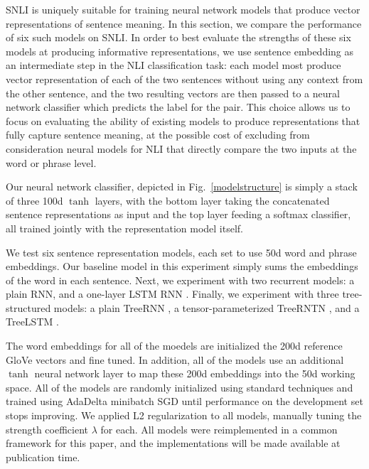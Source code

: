 SNLI is uniquely suitable for training neural network models that produce vector representations of sentence meaning. In this section, we compare the performance of six such models on SNLI. 
In order to best evaluate the strengths of these six models at producing informative representations, we use sentence embedding as an intermediate step in the NLI classification task: each model most produce vector representation of each of the two sentences without using any context from the other sentence, and the two resulting vectors are then passed to a neural network classifier which predicts the label for the pair. This choice allows us to focus on evaluating the ability of existing models to produce representations that fully capture sentence meaning, at the possible cost of excluding from consideration neural models for NLI that directly compare the two inputs at the word or phrase level.



Our neural network classifier, depicted in Fig.~\ref{modelstructure} is simply a stack of three 100d $\tanh$ layers, with the bottom layer taking the concatenated sentence representations as input and the top layer feeding a softmax classifier, all trained jointly with the representation model itself.

We test six sentence representation models, each set to use 50d word and phrase embeddings. Our baseline model in this experiment simply sums the embeddings of the word in each sentence. Next, we experiment with two recurrent models: a plain RNN, and a one-layer LSTM RNN \cite{hochreiter1997long}. Finally, we experiment with three tree-structured models: a plain TreeRNN \cite{socher2011semi}, a tensor-parameterized TreeRNTN \cite{socher2013acl1}, and a TreeLSTM \cite{tai2015improved}.

The word embeddings for all of the moedels are initialized the 200d reference GloVe vectors \cite{pennington2014glove} and fine tuned. In addition, all of the models use an additional $\tanh$ neural network layer to map these 200d embeddings into the 50d working space. All of the models are randomly initialized using standard techniques and trained using AdaDelta \cite{zeiler2012adadelta} minibatch SGD until performance on the development set stops improving. We applied L2 regularization to all models, manually tuning the strength coefficient $\lambda$ for each. All models were reimplemented in a common framework for this paper, and the implementations will be made available at publication time.

